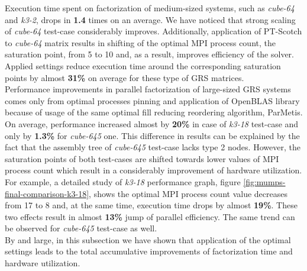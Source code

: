 Execution time spent on factorization of medium-sized systems, such as \textit{cube-64} and \textit{k3-2}, drops in \textbf{1.4} times on an average. We have noticed that strong scaling of \textit{cube-64} test-case considerably improves. Additionally, application of PT-Scotch to \textit{cube-64} matrix results in shifting of the optimal MPI process count, the saturation point, from 5 to 10 and, as a result, improves efficiency of the solver. Applied settings reduce execution time around the corresponding saturation points by almost \textbf{31\%} on average for these type of GRS matrices.\\



Performance improvements in parallel factorization of large-sized GRS systems comes only from optimal processes pinning and application of OpenBLAS library because of usage of the same optimal fill reducing reordering algorithm, ParMetis. On average, performance increased almost by \textbf{20\%} in case of \textit{k3-18} test-case and only by \textbf{1.3\%} for \textit{cube-645} one. This difference in results can be explained by the fact that the assembly tree of \textit{cube-645} test-case lacks type 2 nodes. However, the saturation points of both test-cases are shifted towards lower values of MPI process count which result in a considerably improvement of hardware utilization. For example, a detailed study of \textit{k3-18} performance graph, figure \ref{fig:mumps-final-comparison-k3-18}, shows the optimal MPI process count value decreases from 17 to 8 and, at the same time, execution time drops by almost \textbf{19\%}. These two effects result in almost \textbf{13\%} jump of parallel efficiency. The same trend can be observed for \textit{cube-645} test-case as well.\\


By and large, in this subsection we have shown that application of the optimal settings leads to the total accumulative improvements of factorization time and hardware utilization.\\



